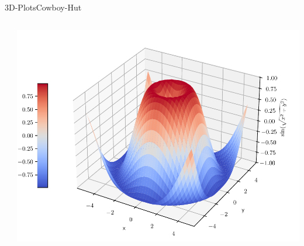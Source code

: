 \documentclass[xelatex,aspectratio=169]{beamer}
\begin{document}
\begin{frame}{3D-Plots}{Cowboy-Hut}
    \begin{columns}
        \begin{column}{0.6\textwidth}
            \vspace{-\baselineskip}
            \small
            \inputminted[firstline=7]{python}{src/plt_3d_cowboy.py}
        \end{column}
        \begin{column}{0.4\textwidth}
            \includegraphics[width=\textwidth]{fig/plt_3d_cowboy.pdf}
        \end{column}
    \end{columns}
\end{frame}
\end{document}
